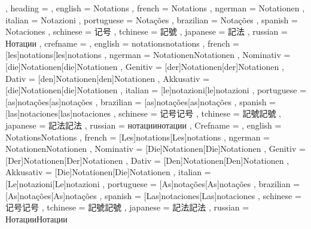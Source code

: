   {
    , heading =   {
                    , english     = Notations
                    , french      = Notations
                    , ngerman     = Notationen
                    , italian     = Notazioni
                    , portuguese  = Notações
                    , brazilian   = Notações
                    , spanish     = Notaciones
                    , schinese    = 记号
                    , tchinese    = 記號
                    , japanese    = 記法
                    , russian     = Нотации
                  }
    , crefname =  {
                    , english     = {notations}{notations}
                    , french      = [les]{notations}[les]{notations}
                    , ngerman     = { {Notationen}{Notationen}
                                      , Nominativ = [die]{Notationen}[die]{Notationen}
                                      , Genitiv   = [der]{Notationen}[der]{Notationen}
                                      , Dativ     = [den]{Notationen}[den]{Notationen}
                                      , Akkusativ = [die]{Notationen}[die]{Notationen}
                                    }
                    , italian     = [le]{notazioni}[le]{notazioni}
                    , portuguese  = [as]{notações}[as]{notações}
                    , brazilian   = [as]{notações}[as]{notações}
                    , spanish     = [las]{notaciones}[las]{notaciones}
                    , schinese    = {记号}{记号}
                    , tchinese    = {記號}{記號}
                    , japanese    = {記法}{記法}
                    , russian     = {нотации}{нотации}
                  }
    , Crefname =  {
                    , english     = {Notations}{Notations}
                    , french      = [Les]{notations}[Les]{notations}
                    , ngerman     = { {Notationen}{Notationen}
                                      , Nominativ = [Die]{Notationen}[Die]{Notationen}
                                      , Genitiv   = [Der]{Notationen}[Der]{Notationen}
                                      , Dativ     = [Den]{Notationen}[Den]{Notationen}
                                      , Akkusativ = [Die]{Notationen}[Die]{Notationen}
                                    }
                    , italian     = [Le]{notazioni}[Le]{notazioni}
                    , portuguese  = [As]{notações}[As]{notações}
                    , brazilian   = [As]{notações}[As]{notações}
                    , spanish     = [Las]{notaciones}[Las]{notaciones}
                    , schinese    = {记号}{记号}
                    , tchinese    = {記號}{記號}
                    , japanese    = {記法}{記法}
                    , russian     = {Нотации}{Нотации}
                  }
  }


